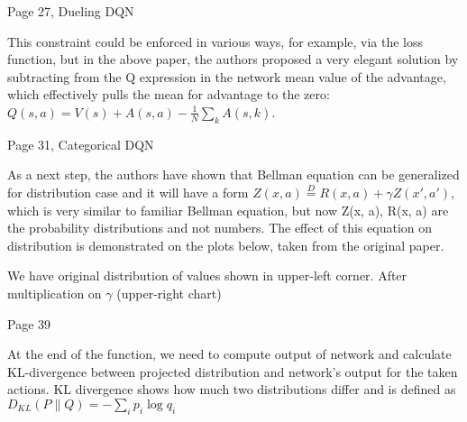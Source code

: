 Page 27, Dueling DQN

This constraint could be enforced in various ways, for example, via the loss
function, but in the above paper, the authors proposed a very elegant solution
by subtracting from the Q expression in the network mean value of the advantage,
which effectively pulls the mean for advantage to the zero:
\begin{math}Q(s, a) = V(s) + A(s, a) - \frac{1}{N}\sum_kA(s,k)\end{math}.

Page 31, Categorical DQN

As a next step, the authors have shown that Bellman equation can be generalized for
distribution case and it will have a form
\begin{math}Z(x, a)\stackrel{D}{=} R(x, a) + \gamma Z(x', a')\end{math}, which
is very similar to familiar Bellman equation, but now Z(x, a), R(x, a) are the
probability distributions and not numbers. The effect of this equation on
distribution is demonstrated on the plots below, taken from the original paper.

We have original distribution of values shown in upper-left corner. After
multiplication on \begin{math}\gamma\end{math} (upper-right chart)

Page 39

At the end of the function, we need to compute output of network and calculate
KL-divergence between projected distribution and network’s output for the taken
actions. KL divergence shows how much two distributions differ and is defined as
\begin{math}D_{KL}(P\|Q) = -\sum_i p_i\log q_i\end{math}
  

